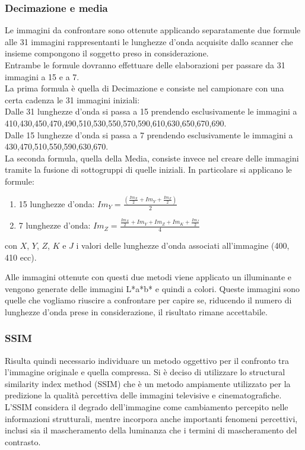 \documentclass[a4paper,11pt]{article}
\begin{document}
    \newpage

    \subsubsection{Decimazione e media}
    Le immagini da confrontare sono ottenute applicando separatamente due formule alle 31 immagini rappresentanti le lunghezze d'onda acquisite dallo scanner che insieme compongono il soggetto preso in considerazione.\\
    Entrambe le formule dovranno effettuare delle elaborazioni per passare da 31 immagini a 15 e a 7.\\
    La prima formula è quella di Decimazione e consiste nel campionare con una certa cadenza le 31 immagini iniziali:\\
    Dalle 31 lunghezze d'onda si passa a 15 prendendo esclusivamente le immagini a 410,430,450,470,490,510,530,550,570,590,610,630,650,670,690.\\
    Dalle 15 lunghezze d'onda si passa a 7 prendendo esclusivamente le immagini a 430,470,510,550,590,630,670.\\
    
    La seconda formula, quella della Media, consiste invece nel creare delle immagini tramite la fusione di sottogruppi di quelle iniziali. 
    In particolare si applicano le formule:
    \begin{enumerate} 
        \item 15 lunghezze d'onda: $Im_Y = \frac{(\frac{Im_X}{2} + Im_Y + \frac{Im_Z}{2})}{2}$
        \item 7 lunghezze d'onda: $Im_Z = \frac{\frac{Im_X}{2} + Im_Y + Im_Z + Im_K + \frac{Im_J}{2} }{4}$
    \end{enumerate}
    con $X$, $Y$, $Z$, $K$ e $J$ i valori delle lunghezze d'onda associati all'immagine (400, 410 ecc).

    Alle immagini ottenute con questi due metodi viene applicato un illuminante e vengono generate delle immagini L*a*b* e quindi a colori. 
    Queste immagini sono quelle che vogliamo riuscire a confrontare per capire se, riducendo il numero di lunghezze d'onda prese in considerazione, il risultato rimane accettabile.

    \newpage


    \subsubsection{SSIM}
    Risulta quindi necessario individuare un metodo oggettivo per il confronto tra l'immagine originale e quella compressa. 
    Si è deciso di utilizzare lo structural similarity index method (SSIM) che è un metodo ampiamente utilizzato per la predizione la qualità percettiva delle immagini televisive e cinematografiche.
    L'SSIM considera il degrado dell'immagine come cambiamento percepito nelle informazioni strutturali, mentre incorpora anche importanti fenomeni percettivi, inclusi sia il mascheramento della luminanza che i termini di mascheramento del contrasto. 
\end{document}
